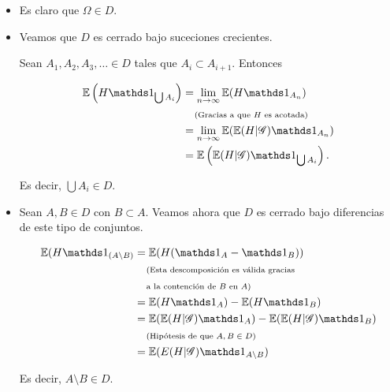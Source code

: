 \begin{itemize}
	\item 
        Es claro que $\Omega \in D$.\par\null

    \item
        Veamos que $D$ es cerrado bajo suceciones crecientes.\par\null

        Sean $A_1, A_2, A_3, \dots \in D$ tales que $A_i \subset A_{i+1}$. Entonces

        \begin{align}
         \E\paren{H \indic_{\bigcup A_i}}   &=  \lim_{n \rightarrow \infty}    \E(H \indic_{A_n})             \\
                                            &\comment{Gracias a que $H$ es acotada}                           \\
                                            &=  \lim_{n \rightarrow \infty}    \E(\E( H | \G) \indic_{A_n})   \\
                                            &=  \E\paren{\E( H | \G) \indic_{\bigcup A_i}}.
        \end{align}

        Es decir, $\bigcup A_i \in D$.\par\null

    \item
        Sean $A, B \in D$ con $B \subset A$. Veamos ahora que $D$ es cerrado bajo diferencias de este tipo de conjuntos. 

        \begin{align}
                \E(H \indic_{(A \setminus B)}   &=  \E(H (\indic_A - \indic_B))                                                 \\
                                                &\lcomment{Esta descomposición es válida gracias}                               \\
                                                &\rcomment{a la contención de $B$ en $A$}                                      \\
                                                &=  \E(H \indic_A) - \E(H \indic_B)                                             \\
                                                &=  \E(\E(H | \G) \indic_A) - \E(\E(H | \G) \indic_B)                           \\
                                                &\comment{Hipótesis de que $A, B \in D$}                                        \\
                                                &=  \E(E(H | \G) \indic_{A \setminus B})
        \end{align}

        Es decir, $A \setminus B \in D$.\par\null
\end{itemize}

